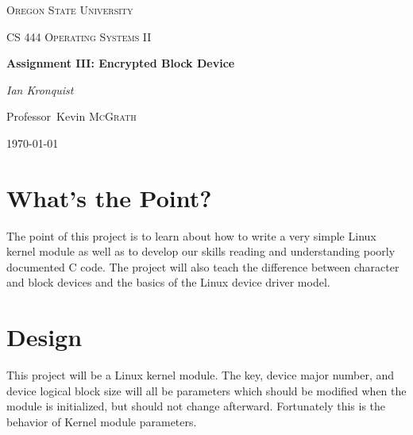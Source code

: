 \documentclass[10pt,conference,draftclsnofoot,onecolumn]{IEEEtran}
\begin{document}
\begin{titlepage}
    \centering
    {\scshape\LARGE Oregon State University \par}
    \vspace{1cm}
    {\scshape\Large CS 444 Operating Systems II\par}
    \vspace{1.5cm}
    {\huge\bfseries Assignment III: Encrypted Block Device\par}
    \vspace{2cm}
    {\Large\itshape Ian Kronquist\par}
    \vfill
    \par
    Professor~Kevin \textsc{McGrath}

    \vfill



\author{
}


\begin{abstract}
The goal of this project was to build an encrypted RAM Disk device driver in the form of a dynamically loadable Linux Kernel Module. We will use the Linux cryptography APIs as well as the block device driver API.
\end{abstract}

    {\large \today\par}
\end{titlepage}

\bigskip
\bigskip
\bigskip

\section{What's the Point?}
The point of this project is to learn about how to write a very simple Linux kernel module as well as to develop our skills reading and understanding poorly documented C code. The project will also teach the difference between character and block devices and the basics of the Linux device driver model.
\section{Design}
This project will be a Linux kernel module. The key, device major number, and device logical block size will all be parameters which should be modified when the module is initialized, but should not change afterward. Fortunately this is the behavior of Kernel module parameters.
\end{document}
